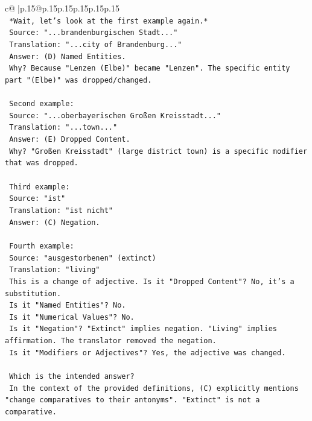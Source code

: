 \documentclass{article}
\begin{document}
{\begin{supertabular}{c@{$\;$}|p{.15\linewidth}@{}p{.15\linewidth}p{.15\linewidth}p{.15\linewidth}p{.15\linewidth}p{.15\linewidth}}
{{{\\ 
\texttt{    *Wait, let's look at the first example again.*} \\
\texttt{    Source: "...brandenburgischen Stadt..."} \\
\texttt{    Translation: "...city of Brandenburg..."} \\
\texttt{    Answer: (D) Named Entities.} \\
\texttt{    Why? Because "Lenzen (Elbe)" became "Lenzen". The specific entity part "(Elbe)" was dropped/changed.} \\
\\ 
\texttt{    Second example:} \\
\texttt{    Source: "...oberbayerischen Großen Kreisstadt..."} \\
\texttt{    Translation: "...town..."} \\
\texttt{    Answer: (E) Dropped Content.} \\
\texttt{    Why? "Großen Kreisstadt" (large district town) is a specific modifier that was dropped.} \\
\\ 
\texttt{    Third example:} \\
\texttt{    Source: "ist"} \\
\texttt{    Translation: "ist nicht"} \\
\texttt{    Answer: (C) Negation.} \\
\\ 
\texttt{    Fourth example:} \\
\texttt{    Source: "ausgestorbenen" (extinct)} \\
\texttt{    Translation: "living"} \\
\texttt{    This is a change of adjective. Is it "Dropped Content"? No, it's a substitution.} \\
\texttt{    Is it "Named Entities"? No.} \\
\texttt{    Is it "Numerical Values"? No.} \\
\texttt{    Is it "Negation"? "Extinct" implies negation. "Living" implies affirmation. The translator removed the negation.} \\
\texttt{    Is it "Modifiers or Adjectives"? Yes, the adjective was changed.} \\
\\ 
\texttt{    Which is the intended answer?} \\
\texttt{    In the context of the provided definitions, (C) explicitly mentions "change comparatives to their antonyms". "Extinct" is not a comparative.} \\
}}}
\end{supertabular}}
\end{document}
